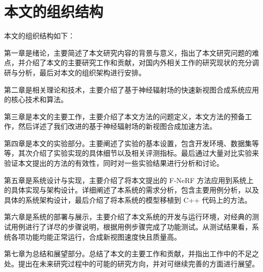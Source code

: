 \section{本文的组织结构}
本文的组织结构如下：

第一章是绪论，主要简述了本文研究内容的背景与意义，指出了本文研究问题的难点，并介绍了本文的主要研究工作和贡献，对国内外相关工作的研究现状的充分调研与分析，最后对本文的组织架构进行安排。

第二章是相关理论和技术，主要介绍了基于神经辐射场的快速新视图合成系统应用的核心技术和算法。

第三章是本文的主要工作，主要介绍了本文方法的问题定义，本文方法的预备工作，然后详述了我们改进的基于神经辐射场的新视图合成加速方法。

第四章是本文的实验部分。主要阐述了实验的基本设置，包含开发环境、数据集等等，其次介绍了实验实现的具体细节以及相关评测指标。最后通过大量对比实验来验证本文提出的方法的有效性，同时对一些实验结果进行分析和讨论。

第五章是系统设计与实现，主要介绍了将本文提出的 F-NeRF 方法应用到系统上的具体实现与架构设计。详细阐述了本系统的需求分析，包含主要用例分析，以及具体的系统架构设计，最后介绍了将本系统的模型移植到 C++ 代码上的方法。

第六章是系统的部署与展示，主要介绍了本文系统的开发与运行环境，对经典的测试用例进行了详尽的步骤说明，根据用例步骤完成了功能测试。从测试结果看，系统各项功能均能正常运行，合成新视图速度快且质量高。

第七章为总结和展望部分。总结了本文的主要工作和贡献，并指出工作中的不足之处。提出在未来研究过程中的可能的研究方向，并对可继续完善的方面进行展望。


